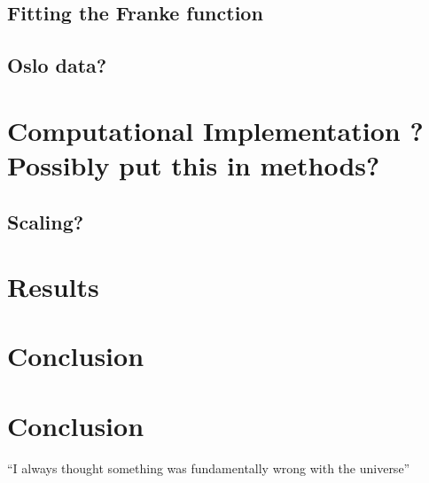 \documentclass[11pt,a4paper]{article}
\begin{document}
\subsection{Fitting the Franke function}
\subsection{Oslo data?}
\section{Computational Implementation ? Possibly put this in methods?}
\subsection{Scaling?}
\section{Results}
\section{Conclusion}

\section{Conclusion}
``I always thought something was fundamentally wrong with the universe'' \citep{hastie01statisticallearning}



\end{document}
